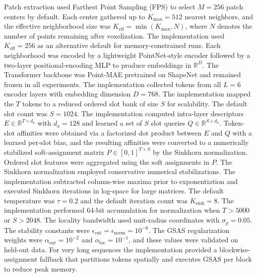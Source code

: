 Patch extraction used Farthest Point Sampling (FPS) to select \(M=256\) patch centers by default. Each center gathered up to \(K_{\max}=512\) nearest neighbors, and the effective neighborhood size was \(K_{\mathrm{eff}}=\min(K_{\max},N)\), where \(N\) denotes the number of points remaining after voxelization. The implementation used \(K_{\mathrm{eff}}=256\) as an alternative default for memory-constrained runs. Each neighborhood was encoded by a lightweight PointNet-style encoder followed by a two-layer positional-encoding MLP to produce embeddings in \(\mathbb{R}^D\). The Transformer backbone was Point-MAE pretrained on ShapeNet and remained frozen in all experiments. The implementation collected tokens from all \(L=6\) encoder layers with embedding dimension \(D=768\). The implementation mapped the \(T\) tokens to a reduced ordered slot bank of size \(S\) for scalability. The default slot count was \(S=1024\). The implementation computed intra-layer descriptors \(E\in\mathbb{R}^{T\times d_a}\) with \(d_a=128\) and learned a set of \(S\) slot queries \(Q\in\mathbb{R}^{S\times d_a}\). Token-slot affinities were obtained via a factorized dot product between \(E\) and \(Q\) with a learned per-slot bias, and the resulting affinities were converted to a numerically stabilized soft-assignment matrix \(P\in[0,1]^{T\times S}\) by the Sinkhorn normalization. Ordered slot features were aggregated using the soft assignments in \(P\). The Sinkhorn normalization employed conservative numerical stabilizations. The implementation subtracted column-wise maxima prior to exponentiation and executed Sinkhorn iterations in log-space for large matrices. The default temperature was \(\tau=0.2\) and the default iteration count was \(K_{\mathrm{sink}}=8\). The implementation performed 64-bit accumulation for normalization when \(T>5000\) or \(S>2048\). The locality bandwidth used unit-radius coordinates with \(\sigma_p=0.05\). The stability constants were \(\epsilon_{\mathrm{ent}}=\epsilon_{\mathrm{norm}}=10^{-6}\). The GSAS regularization weights were \(\alpha_{\mathrm{ent}}=10^{-2}\) and \(\alpha_{\mathrm{loc}}=10^{-1}\), and these values were validated on held-out data. For very long sequences the implementation provided a blockwise-assignment fallback that partitions tokens spatially and executes GSAS per block to reduce peak memory.

